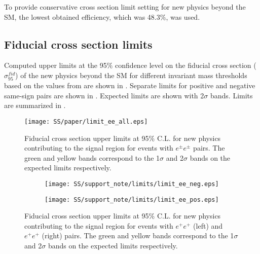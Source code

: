 To provide conservative cross section limit setting for new physics beyond the SM, the lowest obtained efficiency, which was 48.3$\%$, was used.

\subsection{Fiducial cross section limits}

Computed upper limits at the 95$\%$ confidence level on the fiducial cross section ($\sigma_{95}^{fid}$)
of the new physics beyond the SM for different invariant mass thresholds based on the values from 
are shown in . Separate limits for positive and negative same-sign pairs are shown in .
Expected limits are shown with 2$\sigma$ bands. Limits are summarized in .

\begin{figure}[h]
\begin{center}
\texttt{[image: SS/paper/limit\_ee\_all.eps]}
\caption{Fiducial cross section upper limits at 95\% C.L. for new physics contributing to the signal region for events with $e^{\pm}e^{\pm}$ pairs.
The green and yellow bands correspond to the 1$\sigma$ and 2$\sigma$ bands on the expected limits respectively.}
\label{fig:inclusive_fid_limit}
\end{center}
\end{figure}


\begin{figure}
\begin{subfigure}{.5\textwidth}
  \centering
  \texttt{[image: SS/support\_note/limits/limit\_ee\_neg.eps]}
\end{subfigure}%
\begin{subfigure}{.5\textwidth}
  \centering
  \texttt{[image: SS/support\_note/limits/limit\_ee\_pos.eps]}
\end{subfigure}
\caption{Fiducial cross section upper limits at 95\% C.L. for new physics contributing to the signal region
for events with $e^{+}e^{+}$ (left) and $e^{+}e^{+}$ (right) pairs. The green and yellow bands correspond to the 1$\sigma$ and 2$\sigma$ bands on the expected limits respectively.}
  \label{fig:signal_kinematics}
\end{figure}


